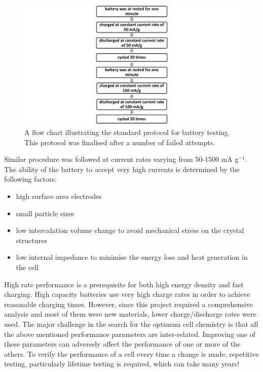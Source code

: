\begin{figure}[tbh!]
\centering
\includegraphics[width=\textwidth]{Figures/chap3fig/flow.pdf}
\caption{A flow chart illustrating the standard protocol for battery testing. This protocol was finalised after a number of failed attempts.}
\label{Figures/chap3fig:flow}
\end{figure}

Similar procedure was followed at current rates varying from 50-1500 mA g$^{-1}$.\\
The ability of the battery to accept very high currents is determined by the following factors:
\begin{itemize}
    \item high surface area electrodes
    \item small particle sizes
    \item low intercalation volume change to avoid mechanical stress on the crystal structures
    \item low internal impedance to minimise the energy loss and heat generation in the cell
\end{itemize}

High rate performance is a prerequisite for both high energy density and fast charging. High capacity batteries use very high charge rates in order to achieve reasonable charging times. However, since this project required a comprehensive analysis and most of them were new materials, lower charge/discharge rates were used. 
The major challenge in the search for the optimum cell chemistry is that all the above mentioned performance parameters are inter-related. Improving one of these parameters can adversely affect the performance of one or more of the others. To verify the performance of a cell every time a change is made, repetitive testing, particularly lifetime testing is required, which can take many years! 





















